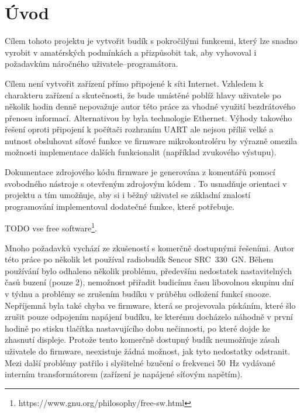 \section*{Úvod}  %
Cílem tohoto projektu je vytvořit budík s pokročilými funkcemi, který lze
snadno vyrobit v amatérských podmínkách a přizpůsobit tak, aby vyhovoval
i požadavkům náročného uživatele--programátora. %

Cílem není vytvořit zařízení přímo připojené k síti Internet. Vzhledem
k charakteru zařízení a skutečnosti, že bude umístěné poblíž hlavy uživatele
po několik hodin denně nepovažuje autor této práce za vhodné využití
bezdrátového přenosu informací. Alternativou by byla technologie Ethernet.
Výhody takového řešení oproti připojení k počítači rozhraním UART ale nejsou
příliš velké a nutnost obsluhovat síťové funkce ve firmware mikrokontroléru by
výrazně omezila možnosti implementace dalších funkcionalit (například zvukového
výstupu).

Dokumentace zdrojového kódu firmware je generována z komentářů pomocí
svobodného nástroje s otevřeným zdrojovým kódem . To
usnadňuje orientaci v projektu a tím umožňuje, aby si i běžný uživatel se
základní znalostí programování implementoval dodatečné funkce, které potřebuje.

TODO vse free software\footnote{https://www.gnu.org/philosophy/free-sw.html}.

Mnoho požadavků vychází ze zkušeností s komerčně dostupnými řešeními. Autor
této práce po několik let používal radiobudík Sencor SRC~330~GN.
Během používání bylo odhaleno několik problému, především nedostatek
nastavitelných časů buzení (pouze 2), nemožnost přiřadit budicímu času
libovolnou skupinu dní v týdnu a problémy se zrušením budíku v průběhu odložení
funkcí snooze. Nepříjemná byla také chyba ve firmware, která se
projevovala pískáním, které šlo zrušit pouze odpojením napájení budíku,
ke kterému docházelo náhodně v první hodině po stisku tlačítka nastavujícího
dobu nečinnosti, po které dojde ke zhasnutí displeje. Protože tento komerčně
dostupný budík neumožňuje zásah uživatele do firmware, neexistuje žádná
možnost, jak tyto nedostatky odstranit. Mezi další problémy patřilo
i slyšitelné bzučení o frekvenci \SI{50}{\hertz} vydávané interním
transformátorem (zařízení je napájené síťovým napětím).
